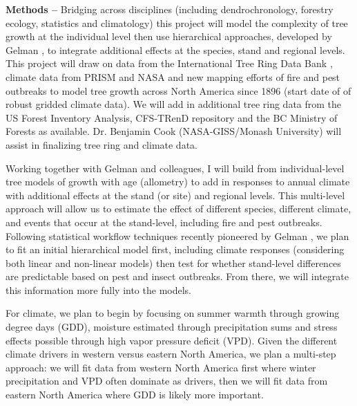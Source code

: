 \documentclass[11pt]{article}
\begin{document}
{\bf Methods -- }
Bridging across disciplines (including dendrochronology, forestry ecology, statistics and climatology) this project will model the complexity of tree growth at the individual level then use hierarchical approaches, developed by Gelman \citep{BDA}, to integrate additional effects at the species, stand and regional levels. This project will draw on data from the International Tree Ring Data Bank \citep{zhao2019international}, climate data from PRISM and NASA and new mapping efforts of fire and pest outbreaks to model tree growth across North America since 1896 (start date of of robust gridded climate data). We will add in additional tree ring data from the US Forest Inventory Analysis, CFS-TRenD repository and the BC Ministry of Forests as available. Dr. Benjamin Cook (NASA-GISS/Monash University) will assist in finalizing tree ring and climate data. 

Working together with Gelman and colleagues, I will build from individual-level tree models of growth with age (allometry) to add in responses to annual climate with additional effects at the stand (or site) and regional levels. This multi-level approach will allow us to estimate the effect of different species, different climate, and events that occur at the stand-level, including fire and pest outbreaks. Following statistical workflow techniques recently pioneered by Gelman \citep{gelman2026bayesian}, we plan to fit an initial hierarchical model first, including climate responses (considering both linear and non-linear models) then test for whether stand-level differences are predictable based on pest and insect outbreaks. From there, we will integrate this information more fully into the models. %

For climate, we plan to begin by focusing on summer warmth through growing degree days (GDD), moisture estimated through precipitation sums and stress effects possible through high vapor pressure deficit (VPD). Given the different climate drivers in western versus eastern North America, we plan a multi-step approach: we will fit data from western North America first where winter precipitation and VPD often dominate as drivers, then we will fit data from eastern North America where GDD is likely more important. 
\end{document}
